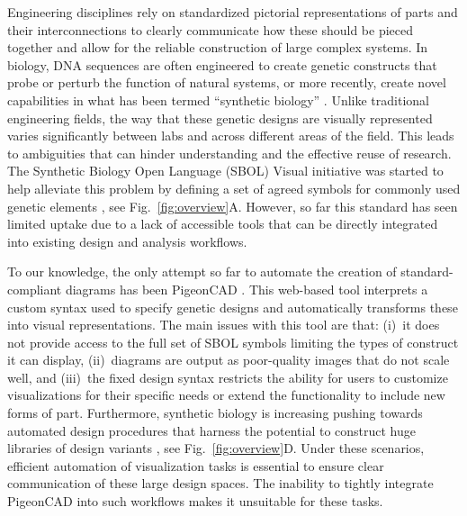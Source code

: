 \documentclass{bioinfo}
\begin{document}
Engineering disciplines rely on standardized pictorial representations of parts and their interconnections to clearly communicate how these should be pieced together and allow for the reliable construction of large complex systems. In biology, DNA sequences are often engineered to create genetic constructs that probe or perturb the function of natural systems, or more recently, create novel capabilities in what has been termed ``synthetic biology'' \citep{Church14a}. Unlike traditional engineering fields, the way that these genetic designs are visually represented varies significantly between labs and across different areas of the field. This leads to ambiguities that can hinder understanding and the effective reuse of research. The Synthetic Biology Open Language (SBOL) Visual initiative was started to help alleviate this problem by defining a set of agreed symbols for commonly used genetic elements \citep{Quinn13a}, see Fig.~\ref{fig:overview}A. However, so far this standard has seen limited uptake due to a lack of accessible tools that can be directly integrated into existing design and analysis workflows.

To our knowledge, the only attempt so far to automate the creation of standard-compliant diagrams has been PigeonCAD \citep{Bhatia13a}. This web-based tool interprets a custom syntax used to specify genetic designs and automatically transforms these into visual representations. The main issues with this tool are that: (i)~it does not provide access to the full set of SBOL symbols limiting the types of construct it can display, (ii)~diagrams are output as poor-quality images that do not scale well, and (iii)~the fixed design syntax restricts the ability for users to customize visualizations for their specific needs or extend the functionality to include new forms of part. Furthermore, synthetic biology is increasing pushing towards automated design procedures that harness the potential to construct huge libraries of design variants \citep{Smanski14a,Bilitchenko11a}, see Fig.~\ref{fig:overview}D. Under these scenarios, efficient automation of visualization tasks is essential to ensure clear communication of these large design spaces. The inability to tightly integrate PigeonCAD into such workflows makes it unsuitable for these tasks.
\end{document}
